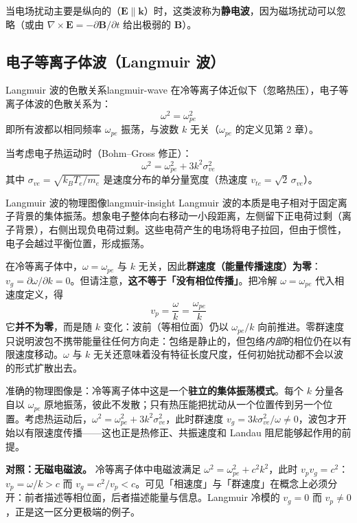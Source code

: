 \documentclass[12pt,a4paper,openany,oneside]{book}
\newcommand{\vect}[1]{\bm{#1}}
\newcommand{\curl}{\nabla\times}
\begin{document}
当电场扰动主要是纵向的（$\vect{E}\parallel\vect{k}$）时，这类波称为\textbf{静电波}，因为磁场扰动可以忽略（或由 $\curl\vect{E} = -\partial\vect{B}/\partial t$ 给出极弱的 $\vect{B}$）。

\subsection{电子等离子体波（Langmuir 波）}

\begin{theorem}{Langmuir 波的色散关系}{langmuir-wave}
在冷等离子体近似下（忽略热压），电子等离子体波的色散关系为：
\[
\omega^2 = \omega_{pe}^2
\label{eq:plasma-frequency}
\]
即所有波都以相同频率 $\omega_{pe}$ 振荡，与波数 $k$ 无关（$\omega_{pe}$ 的定义见第 2 章）。

当考虑电子热运动时（Bohm--Gross 修正）：
\[
\omega^2 = \omega_{pe}^2 + 3k^2 \sigma_{ve}^2
\]
其中 $\sigma_{ve} = \sqrt{k_B T_e/m_e}$ 是速度分布的单分量宽度（热速度 $v_{te}=\sqrt2\,\sigma_{ve}$）。
\end{theorem}

\begin{insight}{Langmuir 波的物理图像}{langmuir-insight}
Langmuir 波的本质是电子相对于固定离子背景的集体振荡。想象电子整体向右移动一小段距离，左侧留下正电荷过剩（离子背景），右侧出现负电荷过剩。这些电荷产生的电场将电子拉回，但由于惯性，电子会越过平衡位置，形成振荡。

在冷等离子体中，$\omega=\omega_{pe}$ 与 $k$ 无关，因此\textbf{群速度（能量传播速度）为零}：$v_g=\partial\omega/\partial k=0$。但请注意，\textbf{这不等于「没有相位传播」}。把冷解 $\omega=\omega_{pe}$ 代入相速度定义，得
\[
v_p = \frac{\omega}{k} = \frac{\omega_{pe}}{k}
\]
它\textbf{并不为零}，而是随 $k$ 变化：波前（等相位面）仍以 $\omega_{pe}/k$ 向前推进。零群速度只说明波包不携带能量往任何方向走：包络是静止的，但包络\emph{内部}的相位仍在以有限速度移动。$\omega$ 与 $k$ 无关还意味着没有特征长度尺度，任何初始扰动都不会以波的形式扩散出去。

准确的物理图像是：冷等离子体中这是一个\textbf{驻立的集体振荡模式}。每个 $k$ 分量各自以 $\omega_{pe}$ 原地振荡，彼此不发散；只有热压能把扰动从一个位置传到另一个位置。考虑热运动后，$\omega^2=\omega_{pe}^2+3k^2\sigma_{ve}^2$，此时群速度 $v_g=3k\sigma_{ve}^2/\omega\neq0$，波包才开始以有限速度传播——这也正是热修正、共振速度和 Landau 阻尼能够起作用的前提。

\smallskip
\textbf{对照：无磁电磁波。} 冷等离子体中电磁波满足 $\omega^2=\omega_{pe}^2+c^2k^2$，此时 $v_pv_g=c^2$：$v_p=\omega/k>c$ 而 $v_g=c^2/v_p<c$。可见「相速度」与「群速度」在概念上必须分开：前者描述等相位面，后者描述能量与信息。Langmuir 冷模的 $v_g=0$ 而 $v_p\neq0$，正是这一区分更极端的例子。
\end{insight}
\end{document}
